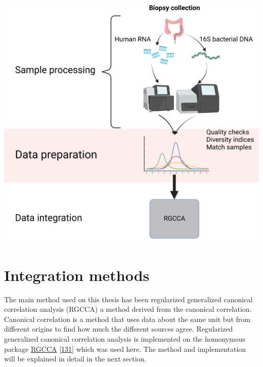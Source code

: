 \documentclass[
  12pt,
  a4paper,
  twoside,
  openright]{book}
\let\origfigure\figure
\let\endorigfigure\endfigure
\renewenvironment{figure}[1][2] {
    \expandafter\origfigure\expandafter[!htp]
} {
    \endorigfigure
}
\begin{document}
\begin{figure}
\includegraphics[width=1\linewidth]{images/workflow_integration2} \caption[Workflow of the analysis process.]{Workflow of the main analysis process of the thesis. Created with BioRender.com}\label{fig:workflow-process}
\end{figure}

\hypertarget{integration-methods}{%
\section{Integration methods}\label{integration-methods}}

The main method used on this thesis has been regularized generalized canonical correlation analysis (RGCCA) a method derived from the canonical correlation.
Canonical correlation is a method that uses data about the same unit but from different origins to find how much the different sources agree.
Regularized generalized canonical correlation analysis is implemented on the homonymous package \href{https://cran.r-project.org/package=RGCCA}{RGCCA} {[}\protect\hyperlink{ref-tenenhaus2017}{131}{]} which was used here.
The method and implementation will be explained in detail in the next section.
\end{document}
